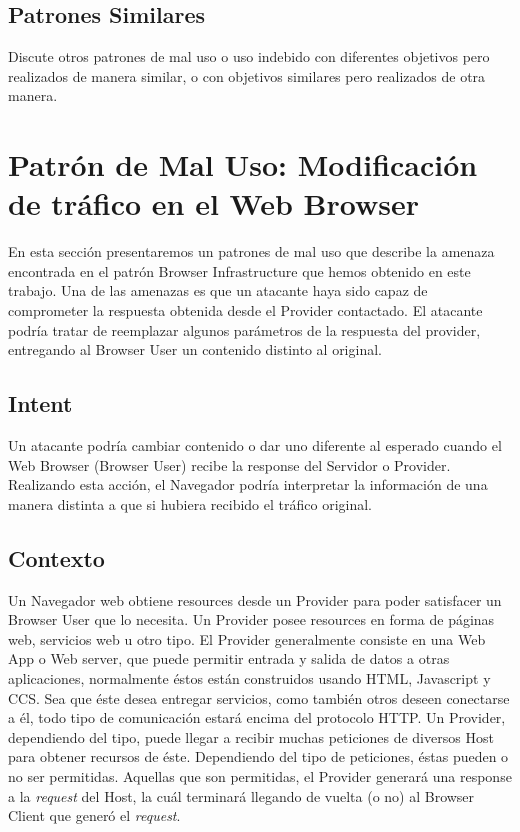 \subsection*{Patrones Similares}
Discute otros patrones de mal uso o uso indebido con diferentes objetivos pero realizados de manera similar, o con objetivos similares pero realizados de otra manera.


\section{Patrón de Mal Uso: Modificación de tráfico en el Web Browser}
En esta sección presentaremos un patrones de mal uso que describe la amenaza encontrada en el patrón Browser Infrastructure que hemos obtenido en este trabajo.
Una de las amenazas es que un atacante haya sido capaz de comprometer la respuesta obtenida desde el Provider contactado. El atacante podría tratar de reemplazar algunos parámetros de la respuesta del provider, entregando al Browser User un contenido distinto al original.

\subsection{Intent}
Un atacante podría cambiar contenido o dar uno diferente al esperado cuando el Web Browser (Browser User) recibe la response del Servidor o Provider. Realizando esta acción, el Navegador podría interpretar la información de una manera distinta a que si hubiera recibido el tráfico original.

\subsection{Contexto}
Un Navegador web obtiene resources desde un Provider para poder satisfacer un Browser User que lo necesita. Un Provider posee resources en forma de páginas web, servicios web u otro tipo. El Provider generalmente consiste en una Web App o Web server, que puede permitir entrada y salida de datos a otras aplicaciones, normalmente éstos están construidos usando HTML, Javascript y CCS. Sea que éste desea entregar servicios, como también otros deseen conectarse a él, todo tipo de comunicación estará encima del protocolo HTTP. Un Provider, dependiendo del tipo, puede llegar a recibir muchas peticiones de diversos Host para obtener recursos de éste. Dependiendo del tipo de peticiones, éstas pueden o no ser permitidas. Aquellas que son permitidas, el Provider generará una response a la \textit{request} del Host, la cuál terminará llegando de vuelta (o no) al Browser Client que generó el \textit{request}.

